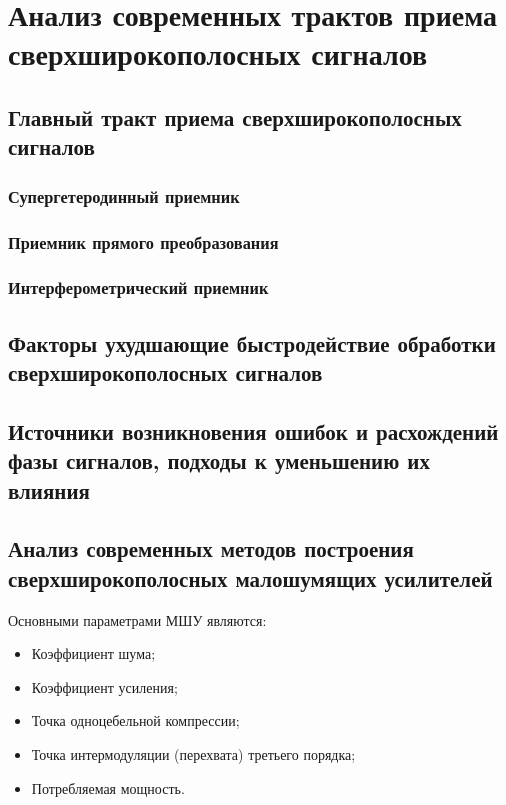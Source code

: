 \chapter{Анализ современных трактов приема сверхширокополосных сигналов}

\section{Главный тракт приема сверхширокополосных сигналов}
\subsection{Супергетеродинный приемник}

\subsection{Приемник прямого преобразования}

\subsection{Интерферометрический приемник}

\section{Факторы ухудшающие быстродействие обработки сверхширокополосных сигналов}

\section{Источники возникновения ошибок и расхождений фазы сигналов, подходы к уменьшению их влияния}

\section{Анализ современных методов построения сверхширокополосных малошумящих усилителей}

Основными параметрами МШУ являются:
\begin{itemize}
	\item Коэффициент шума;
	\item Коэффициент усиления;
	\item Точка одноцебельной компрессии;
	\item Точка интермодуляции (перехвата) третьего порядка;
	\item Потребляемая мощность.
\end{itemize}

